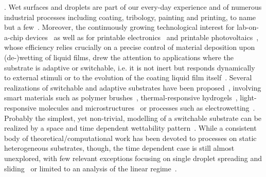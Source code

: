 \documentclass[twocolumn,amsmath,amssymb,showpacs,prl,superscriptaddress]{revtex4-1} %
\begin{document}
\maketitle

\newcommand{\ts}{\textsuperscript}

. Wet surfaces and droplets are part of our every-day experience and of numerous industrial processes including coating, tribology, painting and printing, to name but a few~\cite{gross1980fluid,szeri2010fluid,DERYCK1998278,doi:10.1146/annurev.fluid.31.1.347,DASILVASOBRINHO19991204,singh2010inkjet,jo2009evaluation,Wijshoff2010}. 
Moreover, the continuously growing technological interest for lab-on-a-chip devices~\cite{C6LC00387G,Focke} as well as for printable electronics~\cite{Kim_2005, Luechinger_2008} and printable photovoltaics~\cite{Brabec2001,RH20}, whose efficiency relies crucially on a precise control of material deposition upon (de-)wetting of liquid films, drew the attention to applications where the substrate is adaptive or switchable, i.e. it is not inert but responds dynamically to external stimuli or to the evolution of the coating liquid film itself~\cite{ButtEtAl_Langmuir2018,GuoGuo_RSCAdv2016}. 
Several realizations of switchable and adaptive substrates have been proposed~\cite{LiuChem2005, XiCSR2010}, involving smart materials such as polymer brushes~\cite{CohenStuartEtAl_NatMat2010,ayres2007stimuli,YongEtAl_Mat2018}, thermal-responsive hydrogels~\cite{ChenEtAl_SM2010}, light-responsive molecules and microstructures~\cite{IchimuraEtAl_Science2000,DelormeEtAl_Langmuir2005,OscuratoEtAl_AAMI2017} or processes such as electrowetting~\cite{MugeleEtAl_JPCM2005}.
Probably the simplest, yet non-trivial, modelling of a switchable substrate can be realized by a space and time dependent wettability pattern~\cite{GrawitterStark1}. 
While a consistent body of theoretical/computational work has been devoted to processes on static heterogeneous substrates, though, the time dependent case is still almost unexplored, with few relevant exceptions focusing on single droplet spreading and sliding~\cite{GrawitterStark1,GrawitterStark2,ThieleHartmann} or limited to an analysis of the linear regime~\cite{suman2006dynamics}.
\end{document}
